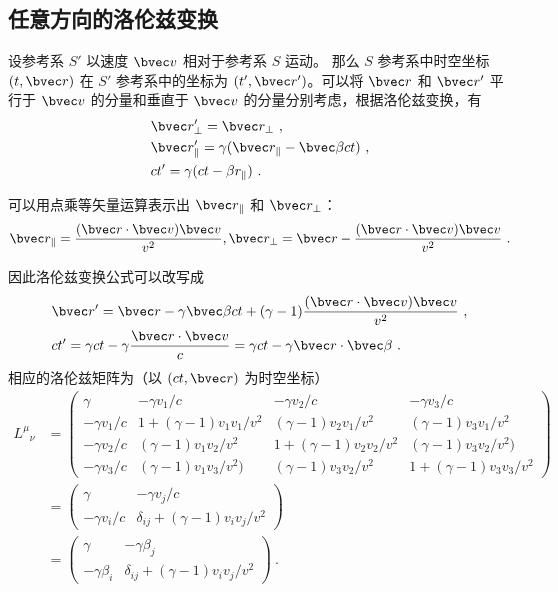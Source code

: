 \subsection{任意方向的洛伦兹变换}
设参考系 $S'$ 以速度 $\bvec v$ 相对于参考系 $S$ 运动。
那么 $S$ 参考系中时空坐标 $(t,\bvec r)$ 在 $S'$ 参考系中的坐标为 $(t',\bvec r')$。可以将 $\bvec r$ 和 $\bvec r'$ 平行于 $\bvec v$ 的分量和垂直于 $\bvec v$ 的分量分别考虑，根据洛伦兹变换，有
\begin{equation}
\begin{aligned}
&\bvec r'_{\perp}=\bvec r_{\perp}~,\\
&\bvec r'_{\parallel}=\gamma(\bvec r_{\parallel}-\bvec \beta ct)~,\\
&ct'=\gamma(ct-\beta r_{\parallel})~.
\end{aligned}
\end{equation}

可以用点乘等矢量运算表示出 $\bvec r_\parallel$ 和 $\bvec r_\perp$：
\begin{equation}
\bvec r_{\parallel}=\frac{(\bvec r\cdot \bvec v)\bvec v}{v^2},\bvec r_{\perp}=\bvec r-\frac{(\bvec r\cdot \bvec v)\bvec v}{v^2}~.
\end{equation}

因此洛伦兹变换公式可以改写成
\begin{equation}
\begin{aligned}
&\bvec r'=\bvec r-\gamma\bvec \beta ct+(\gamma-1)\frac{(\bvec r\cdot \bvec v)\bvec v}{v^2}~,\\
&ct'=\gamma ct-\gamma\frac{\bvec r\cdot\bvec v}{c}=\gamma ct-\gamma \bvec r\cdot\bvec \beta~.
\end{aligned}
\end{equation}
相应的洛伦兹矩阵为（以 $(ct,\bvec r)$ 为时空坐标）
\begin{equation}\label{eq_SRLrtz_6}
\begin{aligned}
{L^\mu}_\nu&=
\left(\begin{matrix}
\gamma& -\gamma v_1/c & -\gamma v_2/c& -\gamma v_3/c\\
-\gamma v_1/c&1+(\gamma-1)v_1v_1/v^2& (\gamma-1)v_2v_1/v^2&(\gamma-1)v_3v_1/v^2\\
-\gamma v_2/c &(\gamma-1)v_1v_2/v^2&1+(\gamma-1)v_2v_2/v^2&(\gamma-1)v_3v_2/v^2)\\
-\gamma v_3/c&(\gamma-1)v_1v_3/v^2)&(\gamma-1)v_3v_2/v^2&1+(\gamma-1)v_3v_3/v^2
\end{matrix}\right)\\
&=\left(\begin{matrix}
\gamma & -\gamma v_j/c \\
-\gamma v_i/c & \delta_{ij}+(\gamma-1)v_iv_j/v^2
\end{matrix}
\right)\\
&=\left(\begin{matrix}
\gamma & -\gamma \beta_j \\
-\gamma \beta_i & \delta_{ij}+(\gamma-1)v_iv_j/v^2
\end{matrix}
\right)~.
\end{aligned}
\end{equation}

